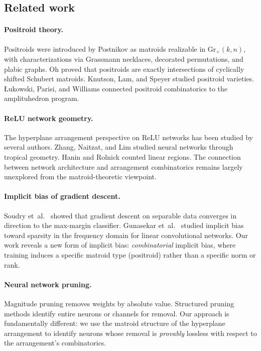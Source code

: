 \documentclass[11pt]{article}
\theoremstyle{definition}
\theoremstyle{remark}
\newcommand{\Gr}{\mathrm{Gr}}
\begin{document}
\subsection{Related work}\label{sec:related}

\paragraph{Positroid theory.}
Positroids were introduced by Postnikov \citep{postnikov2006} as
matroids realizable in $\Gr_+(k,n)$, with characterizations via
Grassmann necklaces, decorated permutations, and plabic graphs.  Oh
\citep{oh2011} proved that positroids are exactly intersections of
cyclically shifted Schubert matroids.
Knutson, Lam, and Speyer \citep{knutson2013} studied positroid
varieties.  Łukowski, Parisi, and Williams \citep{lukowski2023}
connected positroid combinatorics to the amplituhedron program.

\paragraph{ReLU network geometry.}
The hyperplane arrangement perspective on ReLU networks has been
studied by several authors.  Zhang, Naitzat, and Lim
\citep{zhang2018} studied neural networks through tropical geometry.
Hanin and Rolnick \citep{hanin2019} counted linear regions.  The
connection between network architecture and arrangement combinatorics
remains largely unexplored from the matroid-theoretic viewpoint.

\paragraph{Implicit bias of gradient descent.}
Soudry et~al.\ \citep{soudry2018} showed that gradient descent on
separable data converges in direction to the max-margin classifier.
Gunasekar et~al.\ \citep{gunasekar2018} studied implicit bias toward
sparsity in the frequency domain for linear convolutional networks.  Our work reveals a new form of implicit bias:
\emph{combinatorial} implicit bias, where training induces a
specific matroid type (positroid) rather than a specific
norm or rank.

\paragraph{Neural network pruning.}
Magnitude pruning \citep{han2015} removes weights by absolute value.
Structured pruning methods identify entire neurons or channels for
removal.  Our approach is fundamentally different: we use the
matroid structure of the hyperplane arrangement to identify neurons
whose removal is \emph{provably} lossless with respect to the
arrangement's combinatorics.
\end{document}
